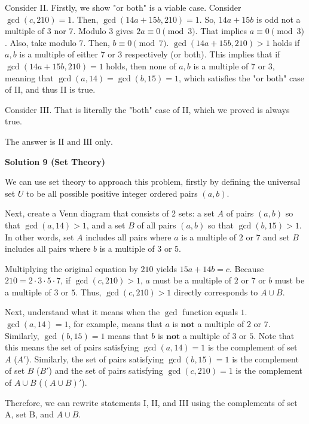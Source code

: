 \begin{enumerate}
 Consider II. Firstly, we show "or both" is a viable case. Consider $\gcd(c,210) = 1$. Then, $\gcd(14a+15b,210) = 1$. So, $14a+15b$ is odd not a multiple of 3 nor 7. Modulo 3 gives $2a \equiv 0 \pmod{3}$. That implies $a \equiv 0 \pmod{3}$. Also, take modulo 7. Then, $b \equiv 0 \pmod{7}$. $\gcd(14a+15b, 210) > 1$ holds if $a,b$ is a multiple of either 7 or 3 respectively (or both). This implies that if $\gcd(14a+15b, 210) = 1$ holds, then none of $a,b$ is a multiple of 7 or 3, meaning that $\gcd(a,14) = \gcd(b,15) = 1$, which satisfies the "or both" case of II, and thus II is true.

 Consider III. That is literally the "both" case of II, which we proved is always true.

 The answer is $\boxed{\text{II and III only}}$.

 



\textbf{Solution 9 (Set Theory)}

We can use set theory to approach this problem, firstly by defining the universal set $U$ to be all possible positive integer ordered pairs $(a, b)$.

 Next, create a Venn diagram that consists of 2 sets: a set $A$ of pairs $(a, b)$ so that $\gcd(a, 14) > 1$, and a set $B$ of all pairs $(a, b)$ so that $\gcd(b, 15) > 1$. In other words, set $A$ includes all pairs where $a$ is a multiple of $2$ or $7$ and set $B$ includes all pairs where $b$ is a multiple of $3$ or $5$. 

 Multiplying the original equation by $210$ yields $15a + 14b = c$. Because $210 = 2 \cdot 3 \cdot 5 \cdot 7$, if $\gcd(c, 210) > 1$, $a$ must be a multiple of $2$ or $7$ or $b$ must be a multiple of $3$ or $5$. Thus, $\gcd(c, 210) > 1$ directly corresponds to $A \cup B$.

 Next, understand what it means when the $\gcd$ function equals $1$. $\gcd(a, 14) = 1$, for example, means that $a$ is $\textbf{not}$ a multiple of $2$ or $7$. Similarly, $\gcd(b, 15) = 1$ means that $b$ is $\textbf{not}$ a multiple of $3$ or $5$. Note that this means the set of pairs satisfying $\gcd(a, 14) = 1$ is the complement of set $A$ ($A'$). Similarly, the set of pairs satisfying $\gcd(b, 15) = 1$ is the complement of set $B$ ($B'$) and the set of pairs satisfying $\gcd(c, 210) = 1$ is the complement of $A \cup B$ ($(A \cup B)'$).

 Therefore, we can rewrite statements I, II, and III using the complements of set A, set B, and $A \cup B$.


\end{enumerate}
